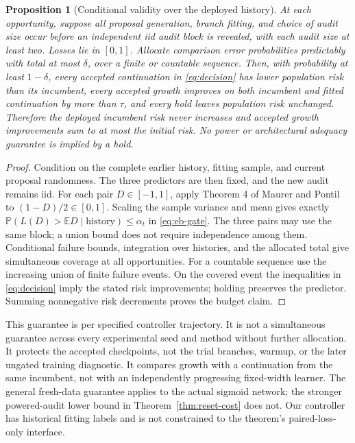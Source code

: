 \documentclass[11pt]{article}
\newtheorem{proposition}[theorem]{Proposition}
\theoremstyle{remark}\newtheorem{remark}[theorem]{Remark}
\newcommand{\E}{\mathbb E}
\begin{document}
\begin{proposition}[Conditional validity over the deployed history]
\label{prop:gate}
At each opportunity, suppose all proposal generation, branch fitting, and
choice of audit size occur before an independent iid audit block is
revealed, with each audit size at least two. Losses lie in $[0,1]$. Allocate comparison error probabilities
predictably with total at most $\delta$, over a finite or countable sequence.
Then, with probability at least $1-\delta$, every accepted continuation in
\eqref{eq:decision} has lower population risk than its incumbent, every
accepted growth improves on both incumbent and fitted continuation by more
than $\tau$, and every hold leaves population risk unchanged. Therefore the
deployed incumbent risk never increases and accepted growth improvements
sum to at most the initial risk. No power or architectural adequacy guarantee
is implied by a hold.
\end{proposition}
\begin{proof}
Condition on the complete earlier history, fitting sample, and current
proposal randomness. The three predictors are then fixed, and the new
audit remains iid. For each pair $D\in[-1,1]$, apply Theorem 4 of
Maurer and Pontil \cite{maurer2009} to $(1-D)/2\in[0,1]$.
Scaling the sample variance and mean gives exactly
$\mathbb P(L(D)>\E D\mid\text{history})\le\alpha_t$ in
\eqref{eq:eb-gate}. The three pairs may use the same block; a union bound
does not require independence among them. Conditional failure bounds,
integration over histories, and the allocated total give simultaneous
coverage at all opportunities. For a countable sequence use the increasing
union of finite failure events. On the covered event the inequalities in
\eqref{eq:decision} imply the stated risk improvements; holding preserves
the predictor. Summing nonnegative risk decrements proves the budget claim.
\end{proof}

This guarantee is per specified controller trajectory. It is not a
simultaneous guarantee across every experimental seed and method without
further allocation. It protects the accepted checkpoints, not the trial
branches, warmup, or the later ungated training diagnostic. It compares
growth with a continuation from the same incumbent, not with an independently
progressing fixed-width learner. The general fresh-data guarantee applies
to the actual sigmoid network; the stronger powered-audit lower bound in
Theorem~\ref{thm:reset-cost} does not. Our controller has historical fitting
labels and is not constrained to the theorem's paired-loss-only interface.
\end{document}
